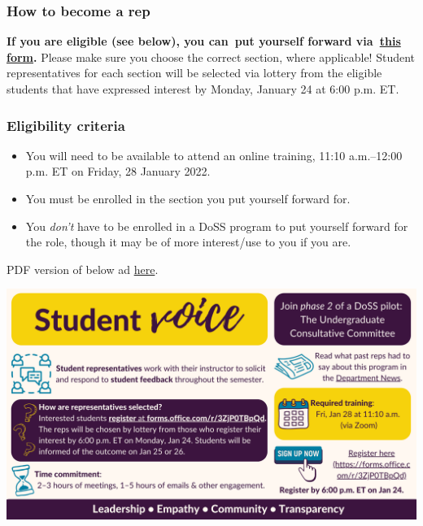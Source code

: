 \documentclass[
  openany]{book}
\begin{document}
\hypertarget{how-to-become-a-rep}{%
\subsubsection{How to become a rep}\label{how-to-become-a-rep}}

\textbf{If you are eligible (see below), you can~put yourself forward via~\href{https://forms.office.com/r/3ZjP0TBpQd}{this form}.} Please make sure you choose the correct section, where applicable! Student representatives for each section will be selected via lottery from the eligible students that have expressed interest by Monday, January 24 at 6:00 p.m. ET.~~

\hypertarget{eligibility-criteria}{%
\subsubsection{Eligibility criteria}\label{eligibility-criteria}}

\begin{itemize}
\item
  You will need to be available to attend an online training, 11:10 a.m.--12:00 p.m. ET on Friday, 28 January 2022.
\item
  You must be enrolled in the section you put yourself forward for.
\item
  You \emph{don't} have to be enrolled in a DoSS program to put yourself forward for the role, though it may be of more interest/use to you if you are.
\end{itemize}

PDF version of below ad \href{https://sta303-bolton.github.io/sta303-w22-courseguide/other-files/student-rep-ad-w22.pdf}{here}.

\includegraphics{images/Student Rep Ad (Winter 2022).png}
\end{document}
